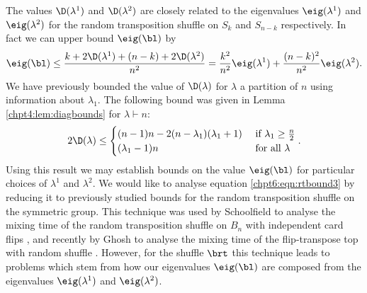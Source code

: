 \documentclass[11pt]{report}
\begin{document}
The values $\D(\lambda^{1})$ and $\D(\lambda^{2})$ are closely related to the eigenvalues $\eig(\lambda^{1})$ and $\eig(\lambda^{2})$ for the random transposition shuffle on $S_{k}$ and $S_{n-k}$ respectively. In fact we can upper bound $\eig(\bl)$ by
\[\eig(\bl ) \leq  \frac{k +2\D(\lambda^{1})+ (n-k) + 2\D(\lambda^{2})}{n^{2}} =  \frac{k^{2}}{n^{2}}\eig(\lambda^{1}) + \frac{(n-k)^{2}}{n^{2}}\eig(\lambda^{2}) .\]
We have previously bounded the value of $\D(\lambda)$ for $\lambda$ a partition of $n$ using information about $\lambda_{1}$. The following bound was given in Lemma \ref{chpt4:lem:diagbounds} for $\lambda \vdash n$:
\begin{eqnarray}
2\D(\lambda) \leq \begin{cases}
(n-1)n - 2(n-\lambda_{1})(\lambda_{1}+1) & 
\textnormal{ 
	if } \lambda_{1} \geq \frac{n}{2}\\
(\lambda_{1}-1)n & \textnormal{ for all } \lambda  
\end{cases}.
\end{eqnarray} 
Using this result we may establish bounds on the value $\eig(\bl)$ for particular choices of $\lambda^{1}$ and $\lambda^{2}$. We would like to analyse equation \eqref{chpt6:eqn:rtbound3} by reducing it to previously studied bounds for the random transposition shuffle on the symmetric group.
This technique was used by Schoolfield to analyse the mixing time of the random transposition shuffle on $B_{n}$ with independent card flips \cite{schoolfield2002random}, and recently by Ghosh to analyse the mixing time of the flip-transpose top with random shuffle \cite{ghosh2019total}.
However, for the shuffle $\brt$ this technique leads to problems which stem from how our eigenvalues $\eig(\bl)$ are composed from the eigenvalues $\eig(\lambda^{1})$ and $\eig(\lambda^{2})$. 	
\end{document}
